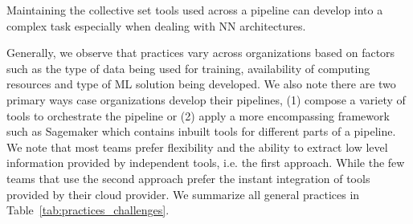
Maintaining the collective set tools used across a pipeline can develop into a complex task especially when dealing with NN architectures.

Generally, we observe that practices vary across organizations based on factors such as the type of data being used for training, availability of computing resources and type of ML solution being developed. We also note there are two primary ways case organizations develop their pipelines, (1) compose a variety of tools to orchestrate the pipeline or (2) apply a more encompassing framework such as Sagemaker which contains inbuilt tools for different parts of a pipeline. We note that most teams prefer flexibility and the ability to extract low level information provided by independent tools, i.e. the first approach. While the few teams that use the second approach prefer the instant integration of tools provided by their cloud provider. We summarize all general practices in Table~\ref{tab:practices_challenges}.

